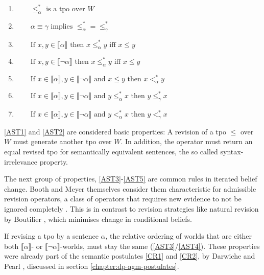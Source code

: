 \documentclass[english, 12pt]{scrartcl}
\theoremstyle{definition}
\theoremstyle{definition}
\theoremstyle{definition}
\newcommand{\modelsOf}[1]{\llbracket #1 \rrbracket}
\begin{document}
\begin{enumerate}[wide=0pt, widest=99,leftmargin=\parindent,label = ($\ast\arabic*$)]
    \item\label{AST1} $\qquad \leq_{\alpha}^{\ast} \textrm{ is a tpo over } W$
    \item\label{AST2} $\qquad\alpha \equiv \gamma \textrm{ implies } \leq_{\alpha}^{\ast}=\leq_{\gamma}^{\ast}$
    \item\label{AST3} $\qquad \textrm{If } x, y \in \modelsOf{\alpha} \textrm{ then } x \leq_{\alpha}^{\ast} y \textrm{ iff } x \leq y$
    \item\label{AST4} $\qquad \textrm{If } x, y \in \modelsOf{\neg\alpha} \textrm{ then } x \leq_{\alpha}^{\ast} y \textrm{ iff } x \leq y$
    \item\label{AST5} $\qquad \textrm{If } x \in \modelsOf{\alpha}, y \in \modelsOf{\neg\alpha} \textrm{ and } x \leq y \textrm{ then } x <_{\alpha}^{\ast} y$
    \item\label{AST6} $\qquad \textrm{If } x \in \modelsOf{\alpha}, y \in \modelsOf{\neg\alpha} \textrm{ and } y \leq_{\alpha}^{\ast} x \textrm{ then } y \leq_{\gamma}^{\ast} x$
    \item\label{AST7} $\qquad \textrm{If } x \in \modelsOf{\alpha}, y \in \modelsOf{\neg\alpha} \textrm{ and } y <_{\alpha}^{\ast} x \textrm{ then } y <_{\gamma}^{\ast} x$
\end{enumerate}

\ref{AST1} and \ref{AST2} are considered basic properties: A revision of a tpo $\leq$ over $W$ must generate another tpo over $W$. In addition, the operator must return an equal revised tpo for semantically equivalent sentences, the so called syntax-irrelevance property.

The next group of properties, \ref{AST3}-\ref{AST5} are common rules in iterated belief change. Booth and Meyer themselves consider them characteristic for admissible revision operators, a class of operators that requires new evidence to not be ignored completely \cite{Booth2006a}. This is in contrast to revision strategies like natural revision by Boutilier \cite{Boutilier1996}, which minimises change in conditional beliefs.

If revising a tpo by a sentence $\alpha$, the relative ordering of worlds that are either both $\modelsOf{\alpha}$- or $\modelsOf{\neg\alpha}$-worlds, must stay the same (\ref{AST3}/\ref{AST4}). These properties were already part of the semantic postulates \ref{CR1} and \ref{CR2}, by Darwiche and Pearl \cite{Darwiche1997}, discussed in section \ref{chapter:dp-agm-postulates}.
\end{document}

